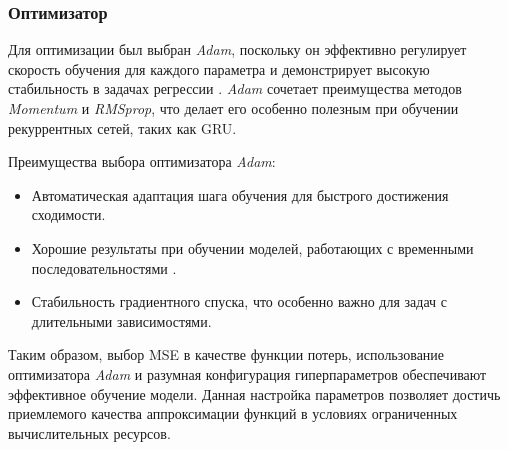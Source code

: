 \subsubsection{Оптимизатор}

Для оптимизации был выбран \textit{Adam}, поскольку он эффективно регулирует скорость обучения для каждого параметра и демонстрирует высокую стабильность в задачах регрессии \cite{HOML}. \textit{Adam} сочетает преимущества методов \textit{Momentum} и \textit{RMSprop}, что делает его особенно полезным при обучении рекуррентных сетей, таких как GRU.

Преимущества выбора оптимизатора \textit{Adam}:
\begin{itemize}
    \item Автоматическая адаптация шага обучения для быстрого достижения сходимости.
    \item Хорошие результаты при обучении моделей, работающих с временными последовательностями \cite{adam}.
    \item Стабильность градиентного спуска, что особенно важно для задач с длительными зависимостями.
\end{itemize}

Таким образом, выбор MSE в качестве функции потерь, использование оптимизатора \textit{Adam} и разумная конфигурация гиперпараметров обеспечивают эффективное обучение модели. Данная настройка параметров позволяет достичь приемлемого качества аппроксимации функций в условиях ограниченных вычислительных ресурсов.
